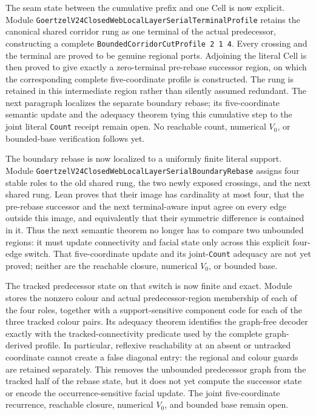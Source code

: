 \documentclass[11pt]{article}
\theoremstyle{definition}
\begin{document}
The seam state between the cumulative prefix and one Cell is now explicit.
Module \texttt{GoertzelV24ClosedWebLocalLayerSerialTerminalProfile} retains
the canonical shared corridor rung as one terminal of the actual predecessor,
constructing a complete \texttt{BoundedCorridorCutProfile 2 1 4}.  Every
crossing and the terminal are proved to be genuine regional ports.  Adjoining
the literal Cell is then proved to give exactly a zero-terminal pre-rebase
successor region, on which the corresponding complete five-coordinate profile
is constructed.  The rung is retained in this intermediate region rather than
silently assumed redundant.  The next paragraph localizes the separate
boundary rebase; its five-coordinate semantic update and the adequacy theorem
tying this cumulative step to the joint literal \texttt{Count} receipt remain
open.  No reachable count, numerical $V_0$, or bounded-base verification
follows yet.

The boundary rebase is now localized to a uniformly finite literal support.
Module \texttt{GoertzelV24ClosedWebLocalLayerSerialBoundaryRebase} assigns
four stable roles to the old shared rung, the two newly exposed crossings,
and the next shared rung.  Lean proves that their image has cardinality at
most four, that the pre-rebase successor and the next terminal-aware input
agree on every edge outside this image, and equivalently that their symmetric
difference is contained in it.  Thus the next semantic theorem no longer has
to compare two unbounded regions: it must update connectivity and facial state
only across this explicit four-edge switch.  That five-coordinate update and
its joint-\texttt{Count} adequacy are not yet proved; neither are the reachable
closure, numerical $V_0$, or bounded base.

The tracked predecessor state on that switch is now finite and exact.  Module
stores the nonzero colour and actual predecessor-region membership of each
of the four roles, together with a support-sensitive component code for each
of the three tracked colour pairs.  Its adequacy theorem identifies the
graph-free decoder exactly with the tracked-connectivity predicate used by
the complete graph-derived profile.  In particular, reflexive reachability
at an absent or untracked coordinate cannot create a false diagonal entry:
the regional and colour guards are retained separately.  This removes the
unbounded predecessor graph from the tracked half of the rebase state, but it
does not yet compute the successor state or encode the occurrence-sensitive
facial update.  The joint five-coordinate recurrence, reachable closure,
numerical $V_0$, and bounded base remain open.
\end{document}
